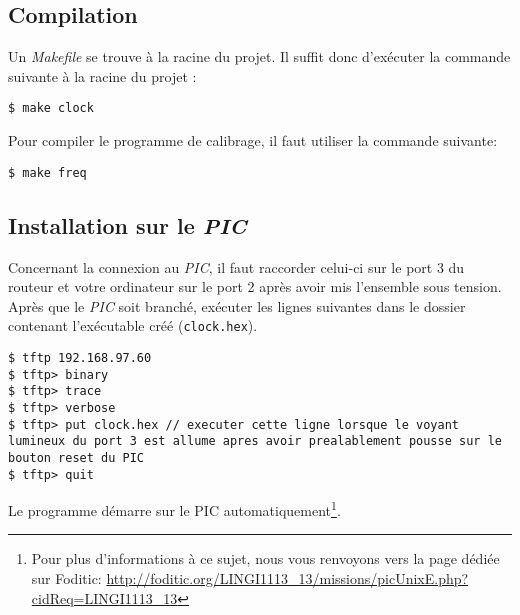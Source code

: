 
\subsection{Compilation}

Un \textit{Makefile} se trouve à la racine du projet. Il suffit donc d'exécuter la commande suivante à la racine du projet :

\begin{lstlisting}
$ make clock
\end{lstlisting}

Pour compiler le programme de calibrage, il faut utiliser la commande suivante:

\begin{lstlisting}
$ make freq
\end{lstlisting}


\subsection{Installation sur le \textit{PIC}}

Concernant la connexion au \textit{PIC}, il faut raccorder celui-ci sur le port 3 du routeur et votre ordinateur sur le port 2 après avoir mis l'ensemble sous tension.
Après que le \textit{PIC} soit branché, exécuter les lignes suivantes dans le dossier contenant l'exécutable créé (\texttt{clock.hex}).
\begin{lstlisting}
$ tftp 192.168.97.60
$ tftp> binary
$ tftp> trace
$ tftp> verbose
$ tftp> put clock.hex // executer cette ligne lorsque le voyant lumineux du port 3 est allume apres avoir prealablement pousse sur le bouton reset du PIC
$ tftp> quit
\end{lstlisting}

Le programme démarre sur le PIC automatiquement\footnote{Pour plus d'informations à ce sujet, nous vous renvoyons vers la page dédiée sur Foditic: \url{http://foditic.org/LINGI1113_13/missions/picUnixE.php?cidReq=LINGI1113_13}}.
